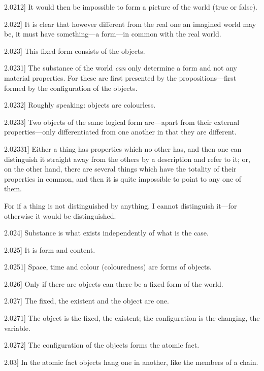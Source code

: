 \documentclass[12pt,oneside]{book}[2007/10/19]
\newcommand{\PropositionE}[2]{%
  \item[\phantomsection\label{PropE:#1}\PropGRef{#1}] #2%
}
\newcommand{\PropGRef}[1]{\hyperref[PropG:#1]{#1}}
\begin{document}
\begin{propositions}
\PropositionE{2.0212}
{It would then be impossible to form a picture
of the world (true or false).}


\PropositionE{2.022}
{It is clear that however different from the real
one an imagined world may be, it must have something---a
form---in common with the real world.}


\PropositionE{2.023}
{This fixed form consists of the objects.}


\PropositionE{2.0231}
{The substance of the world \emph{can} only determine
a form and not any material properties. For these
are first presented by the propositions---first formed
by the configuration of the objects.}


\PropositionE{2.0232}
{Roughly speaking: objects are colourless.}


\PropositionE{2.0233}
{Two objects of the same logical form are---apart
from their external prop\-er\-ties---only differentiated
from one another in that they are
different.}


\PropositionE{2.02331}
{Either a thing has properties which no other
has, and then one can distinguish it straight away
from the others by a description and refer to it;
or, on the other hand, there are several things
which have the totality of their properties in
common, and then it is quite impossible to point
to any one of them.

For if a thing is not distinguished by anything,
I cannot distinguish it---for otherwise it would be
distinguished.}


\PropositionE{2.024}
{Substance is what exists independently of what
is the case.}


\PropositionE{2.025}
{It is form and content.}


\PropositionE{2.0251}
{Space, time and colour (colouredness) are forms
of objects.}


\PropositionE{2.026}
{Only if there are objects can there be a fixed
form of the world.}


\PropositionE{2.027}
{The fixed, the existent and the object are
one.}


\PropositionE{2.0271}
{The object is the fixed, the existent; the configuration
is the changing, the variable.}


\PropositionE{2.0272}
{The configuration of the objects forms the
atomic fact.}


\PropositionE{2.03}
{In the atomic fact objects hang one in another,
like the members of a chain.}



\end{propositions}
\end{document}
